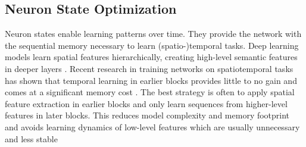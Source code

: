 




\subsection{Neuron State Optimization}
\label{sec:mem}

Neuron states enable learning patterns over time. They provide the network with the sequential memory necessary to learn (spatio-)temporal tasks. Deep learning models learn spatial features hierarchically, creating high-level semantic features in deeper layers \cite{10.1145/1553374.1553453}. Recent research in training networks on spatiotemporal tasks has shown that temporal learning in earlier blocks provides little to no gain and comes at a significant memory cost \cite{red,10204090,yik2024neurobench,9749022}. The best strategy is often to apply spatial feature extraction in earlier blocks and only learn sequences from higher-level features in later blocks. This reduces model complexity and memory footprint and avoids learning dynamics of low-level features which are usually unnecessary and less stable


